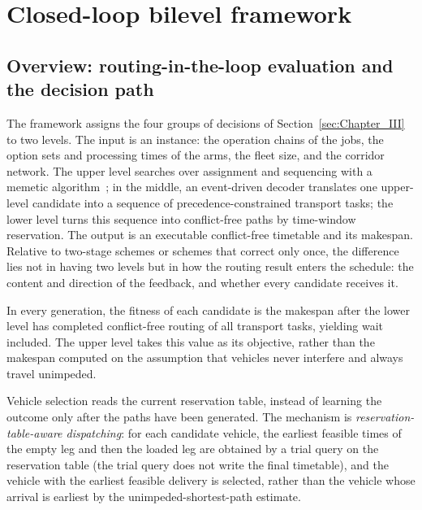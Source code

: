 \documentclass[manuscript,screen,review]{acmart}
\begin{document}
\section{Closed-loop bilevel framework}
\label{sec:Chapter_IV}
\subsection{Overview: routing-in-the-loop evaluation and the decision path}
\label{sec:overview}

The framework assigns the four groups of decisions of Section~\ref{sec:Chapter_III} to two levels. The input is an instance: the operation chains of the jobs,
the option sets and processing times of the arms, the fleet size, and the corridor network. The upper level searches over assignment and sequencing with a memetic algorithm~\cite{zhang2024memetic}; in the middle,
an event-driven decoder translates one upper-level candidate into a sequence of precedence-constrained transport tasks; the lower level turns
this sequence into conflict-free paths by time-window reservation.
The output is an executable conflict-free timetable and its makespan.
Relative to two-stage schemes or schemes that correct only once, the difference lies not in having two levels but in how the routing result enters the schedule: the content and direction of the feedback, and whether every candidate receives it.


\begin{description}[leftmargin=0pt,topsep=3pt,itemsep=3pt]
  \item[The evaluation path, i.e.\ \emph{routing-in-the-loop evaluation}.]
  In every generation, the fitness of each candidate is the makespan after the lower level has completed conflict-free routing of all transport tasks, yielding wait included.
  The upper level takes this value as its objective, rather than the makespan computed on the assumption that vehicles never interfere and always travel unimpeded.
  \item[The decision path.]
  Vehicle selection reads the current reservation table, instead of learning the outcome only after the paths have been generated.
  The mechanism is \emph{reservation-table-aware dispatching}: for each candidate vehicle, the earliest feasible times of the empty leg and then the loaded leg are obtained by a trial query on the reservation table (the trial query does not write the final timetable), and the vehicle with the earliest feasible delivery is selected, rather than the vehicle whose arrival is earliest by the unimpeded-shortest-path estimate.
\end{description}
\end{document}
